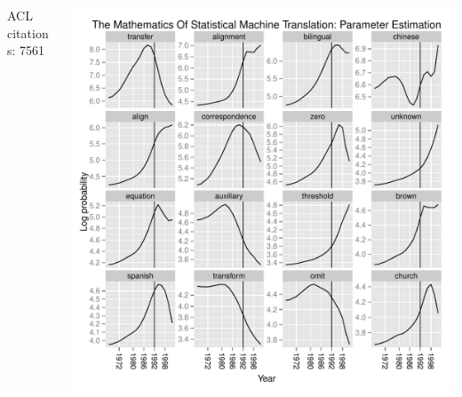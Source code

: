 \documentclass{beamer}
\begin{document}
{\begin{columns}
\begin{column}[left]{0.3\linewidth}
{      }
      ACL citations: 7561
      \end{column}
    \begin{column}[left]{0.7\linewidth}
      \includegraphics[width=1.0\textwidth]{figs/acl_brown.pdf}
    \end{column}
  \end{columns}

}


\end{document}
